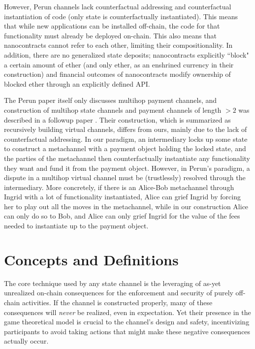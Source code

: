 \documentclass[prb,floatfix,reprint,nofootinbib,amsmath,amssymb,epsfig,pre,floats,letterpaper,groupedaffiliation,tightenlines,allcolors=blue,11pt]{revtex4}
\theoremstyle{definition}
\theoremstyle{definition}
\theoremstyle{definition}
\begin{document}
However, Perun channels lack counterfactual addressing and counterfactual instantiation of code (only state is counterfactually instantiated). This means that while new applications can be installed off-chain, the code for that functionality must already be deployed on-chain. This also means that nanocontracts cannot refer to each other, limiting their compositionality. In addition, there are no generalized state deposits; nanocontracts explicitly ``block" a certain amount of ether (and only ether, as an enshrined currency in their construction) and financial outcomes of nanocontracts modify ownership of blocked ether through an explicitly defined API.

The Perun paper itself only discusses multihop payment channels, and construction of multihop state channels and payment channels of length $> 2$ was described in a followup paper \cite{perun2}. Their construction, which is summarized as recursively building virtual channels, differs from ours, mainly due to the lack of counterfactual addressing. In our paradigm, an intermediary locks up some state to construct a metachannel with a payment object holding the locked state, and the parties of the metachannel then counterfactually instantiate any functionality they want and fund it from the payment object. However, in Perun's paradigm, a dispute in a multihop virtual channel must be (trustlessly) resolved through the intermediary. More concretely, if there is an Alice-Bob metachannel through Ingrid with a lot of functionality instantiated, Alice can grief Ingrid by forcing her to play out all the moves in the metachannel, while in our construction Alice can only do so to Bob, and Alice can only grief Ingrid for the value of the fees needed to instantiate up to the payment object.

\section{Concepts and Definitions}

The core technique used by any state channel is the leveraging of as-yet unrealized on-chain consequences for the enforcement and security of purely off-chain activities. If the channel is constructed properly, many of these consequences will \textit{never} be realized, even in expectation. Yet their presence in the game theoretical model is crucial to the channel's design and safety, incentivizing participants to avoid taking actions that might make these negative consequences actually occur.
\end{document}
